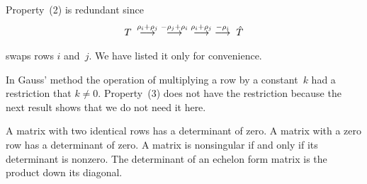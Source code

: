 \begin{remark}  \label{rem:SwapRowsRedun}
Property~(2) is redundant since
\begin{equation*}
   T\;\mathrel{ \mathop{\longrightarrow}\limits^{\rho_i+\rho_j\mathstrut}_{ \begin{subarray}{l} \relax \end{subarray}}}
    \;\mathrel{ \mathop{\longrightarrow}\limits^{-\rho_j+\rho_i\mathstrut}_{ \begin{subarray}{l} \relax \end{subarray}}}
    \;\mathrel{ \mathop{\longrightarrow}\limits^{\rho_i+\rho_j\mathstrut}_{ \begin{subarray}{l} \relax \end{subarray}}}
    \;\mathrel{ \mathop{\longrightarrow}\limits^{-\rho_i\mathstrut}_{ \begin{subarray}{l} \relax \end{subarray}}}
    \;\hat{T}
\end{equation*}
swaps rows \( i \) and~\( j \).
We have listed it only for convenience.
\end{remark}

\begin{remark}
In Gauss' method the operation of multiplying a row by a constant~$k$
had a restriction that $k\neq 0$. 
Property~(3) does not have the restriction because the next result
shows that we do not need it here.
\end{remark}


\begin{lemma}   \label{le:IdenRowsDetZero}
A matrix with two identical rows has a determinant of zero.
A matrix with a zero row has a determinant of zero.
A matrix is nonsingular if and only if its determinant is nonzero.
The determinant of an echelon form matrix is the product down its diagonal.
\end{lemma}

